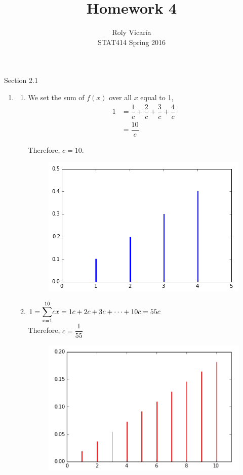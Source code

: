 \documentclass{article}
\title{Homework 4}
\author{Roly Vicar\'ia \\ STAT414 Spring 2016}
\begin{document}
    
    \maketitle
    
    Section 2.1
    \begin{enumerate}
     
     \addtocounter{enumi}{2}
     
     \item 
      \begin{enumerate}
       \item 
	  We set the sum of $f(x)$ over all $x$ equal to 1,  
	  \begin{align*}
	  1 &= \dfrac{1}{c} + \dfrac{2}{c} + \dfrac{3}{c} + \dfrac{4}{c} \\
	    &= \dfrac{10}{c} 
	  \end{align*}
	  
	  Therefore, $c = 10$.
	  
	  \begin{figure}[h!]
	    \centering
	    \includegraphics[scale=.5]{./images/3a_pmf-line_graph.png}
	  \end{figure}
	
	\item 
	  $1 = \mathlarger{\sum}_{x=1}^{10}{cx} = 1c + 2c + 3c + \cdots + 10c = 55c$ \\
	  Therefore, $c = \dfrac{1}{55}$
	  
	  \begin{figure}[h!]
	    \centering
	    \includegraphics[scale=.5]{./images/3b_pmf-line_graph.png}
	  \end{figure}


\end{enumerate}
\end{enumerate}
\end{document}
